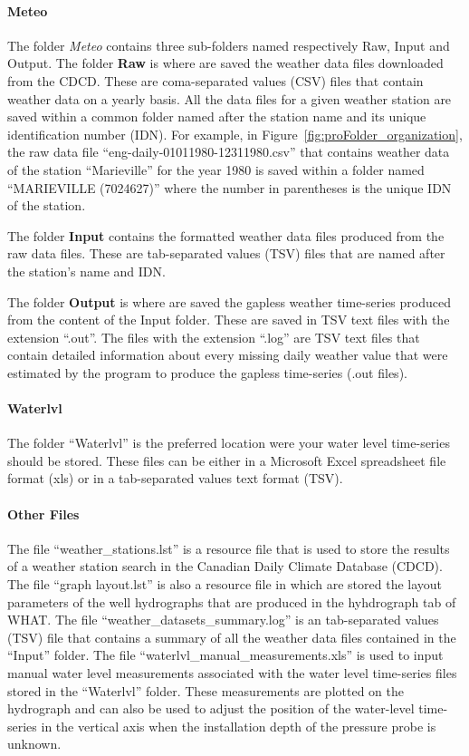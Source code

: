 \documentclass[WHATMANUAL.tex]{subfiles}
\begin{document}
\paragraph{Meteo} The folder \emph{Meteo} contains three sub-folders named respectively Raw, Input and Output. The folder \textbf{Raw} is where are saved the weather data files downloaded from the CDCD. These are coma-separated values (CSV) files that contain weather data on a yearly basis. All the data files for a given weather station are saved within a common folder named after the station name and its unique identification number (IDN). For example, in Figure~\ref{fig:proFolder_organization}, the raw data file ``eng-daily-01011980-12311980.csv'' that contains weather data of the station ``Marieville'' for the year 1980 is saved within a folder named ``MARIEVILLE (7024627)'' where the number in parentheses is the unique IDN of the station.

The folder \textbf{Input} contains the formatted weather data files produced from the raw data files. These are tab-separated values (TSV) files that are named after the station's name and IDN.

The folder \textbf{Output} is where are saved the gapless weather time-series produced from the content of the Input folder. These are saved in TSV text files with the extension ``.out''. The files with the extension ``.log'' are TSV text files that contain detailed information about every missing daily weather value that were estimated by the program to produce the gapless time-series (.out files).

\paragraph{Waterlvl} The folder ``Waterlvl'' is the preferred location were your water level time-series should be stored. These files can be  either in a Microsoft Excel spreadsheet file format (xls) or in a tab-separated values text format (TSV).

\paragraph{Other Files} The file ``weather\_stations.lst'' is a resource file that is used to store the results of a weather station search in the Canadian Daily Climate Database (CDCD). The file ``graph layout.lst'' is also a resource file in which are stored the layout parameters of the well hydrographs that are produced in the hyhdrograph tab of WHAT. The file ``weather\_datasets\_summary.log'' is an tab-separated values (TSV) file that contains a summary of all the weather data files contained in the ``Input'' folder. The file ``waterlvl\_manual\_measurements.xls'' is used to input manual water level measurements associated with the water level time-series files stored in the ``Waterlvl'' folder. These measurements are plotted on the hydrograph and can also be used to adjust the position of the water-level time-series in the vertical axis when the installation depth of the pressure probe is unknown.\vspace{1cm}
\end{document}
